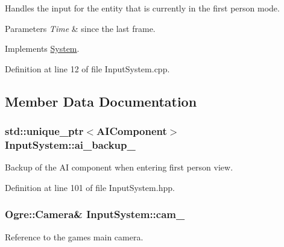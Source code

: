 Handles the input for the entity that is currently in the first person mode. 


\begin{DoxyParams}{Parameters}
{\em Time} & since the last frame. \\
\hline
\end{DoxyParams}


Implements \hyperlink{class_system_a6d54c9bd38eb43d620a1451cb0925472}{System}.



Definition at line 12 of file Input\+System.\+cpp.



\subsection{Member Data Documentation}
\subsubsection[{\texorpdfstring{ai\+\_\+backup\+\_\+}{ai_backup_}}]{\setlength{\rightskip}{0pt plus 5cm}std\+::unique\+\_\+ptr$<${\bf A\+I\+Component}$>$ Input\+System\+::ai\+\_\+backup\+\_\+\hspace{0.3cm}{\ttfamily [private]}}\hypertarget{class_input_system_a4db625dcec72e55ecc0c4b0b52f5263a}{}\label{class_input_system_a4db625dcec72e55ecc0c4b0b52f5263a}


Backup of the AI component when entering first person view. 



Definition at line 101 of file Input\+System.\+hpp.

\subsubsection[{\texorpdfstring{cam\+\_\+}{cam_}}]{\setlength{\rightskip}{0pt plus 5cm}Ogre\+::\+Camera\& Input\+System\+::cam\+\_\+\hspace{0.3cm}{\ttfamily [private]}}\hypertarget{class_input_system_a7725c6f5b40f31c3bd89c55a44641cb7}{}\label{class_input_system_a7725c6f5b40f31c3bd89c55a44641cb7}


Reference to the game\textquotesingle{}s main camera. 



